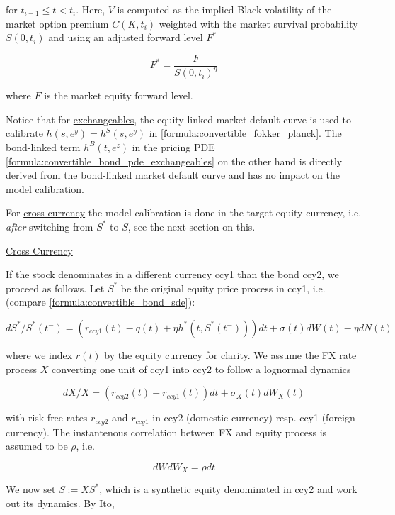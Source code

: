 for $t_{i-1} \leq t < t_i$. Here, $V$ is computed as the implied Black volatility of the market option premium
$C(K,t_i)$ weighted with the market survival probability $S(0,t_i)$ and using an adjusted forward level $F^*$

\begin{equation}
  F^* = \frac{F}{S(0,t_i)^\eta}
\end{equation}

where $F$ is the market equity forward level.

Notice that for \underline{exchangeables}, the equity-linked market default curve is used to calibrate
$h(s,e^y) = h^S(s,e^y)$ in \ref{formula:convertible_fokker_planck}. The bond-linked term $h^B(t,e^z)$ in the pricing PDE
\ref{formula:convertible_bond_pde_exchangeables} on the other hand is directly derived from the bond-linked market
default curve and has no impact on the model calibration.

For \underline{cross-currency} the model calibration is done in the target equity currency, i.e. {\em after} switching
from $S^*$ to $S$, see the next section on this.

\underline{Cross Currency}

If the stock denominates in a different currency ccy1 than the bond ccy2, we proceed as follows. Let $S^*$ be the
original equity price process in ccy1, i.e. (compare \ref{formula:convertible_bond_sde}):

\begin{equation}
  dS^* / S^*(t^-) = (r_{ccy1}(t) - q(t) + \eta h^*(t, S^*(t^-))) dt + \sigma(t) dW(t) - \eta dN(t)
\end{equation}

where we index $r(t)$ by the equity currency for clarity. We assume the FX rate process $X$ converting one unit of ccy1 into
ccy2 to follow a lognormal dynamics

\begin{equation}
  dX / X = (r_{ccy2}(t) - r_{ccy1}(t)) dt + \sigma_X(t) dW_X(t)
\end{equation}

with risk free rates $r_{ccy2}$ and $r_{ccy1}$ in ccy2 (domestic currency) resp. ccy1 (foreign currency). The
instantenous correlation between FX and equity process is assumed to be $\rho$, i.e.

\begin{equation}
  dW dW_X = \rho dt
\end{equation}

 We now set $S:=XS^*$, which is a synthetic equity denominated in ccy2 and work out its dynamics. By Ito,

